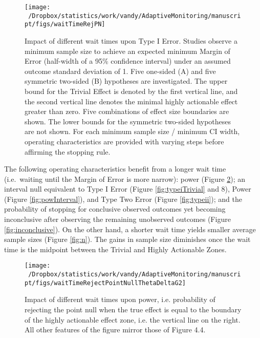 \documentclass[12pt,oneside]{book}
\newlength{\li}\setlength{\li}{14.48pt}
\newlength{\di}\setlength{\di}{-3.5mm}
\theoremstyle{definition}
\theoremstyle{definition}
\theoremstyle{definition}
\theoremstyle{remark}
\begin{document}
\begin{figure}[H]

{\centering \texttt{[image: ~/Dropbox/statistics/work/vandy/AdaptiveMonitoring/manuscript/figs/waitTimeRejPN]} 

}

\caption{Impact of different wait times upon Type I Error.  Studies observe a minimum sample size to achieve an expected minimum Margin of Error (half-width of a 95\% confidence interval) under an assumed outcome standard deviation of 1.  Five one-sided (A) and five symmetric two-sided (B) hypotheses are investigated.  The upper bound for the Trivial Effect is denoted by the first vertical line, and the second vertical line denotes the minimal highly actionable effect greater than zero. Five combinations of effect size boundaries are shown.  The lower bounds for the symmetric two-sided hypotheses are not shown.  For each minimum sample size / minimum CI width, operating characteristics are provided with varying steps before affirming the stopping rule.}\label{fig:power}
\end{figure}

The following operating characteristics benefit from a longer wait time
(i.e.~waiting until the Margin of Error is more narrow): power (Figure
\ref{fig:powerImpact}); an interval null equivalent to Type I Error
(Figure \ref{fig:typeiTrivial} and 8), Power (Figure
\ref{fig:powInterval}), and Type Two Error (Figure \ref{fig:typeii});
and the probability of stopping for conclusive observed outcomes yet
becoming inconclusive after observing the remaining unobserved outcomes
(Figure \ref{fig:inconclusive}). On the other hand, a shorter wait time
yields smaller average sample sizes (Figure \ref{fig:n}). The gains in
sample size diminishes once the wait time is the midpoint between the
Trivial and Highly Actionable Zones.

\begin{figure}[H]

{\centering \texttt{[image: ~/Dropbox/statistics/work/vandy/AdaptiveMonitoring/manuscript/figs/waitTimeRejectPointNullThetaDeltaG2]} 

}

\caption{Impact of different wait times upon power, i.e. probability of rejecting the point null when the true effect is equal to the boundary of the highly actionable effect zone, i.e. the vertical line on the right. All other features of the figure mirror those of Figure 4.4. }\label{fig:powerImpact}
\end{figure}
\end{document}
